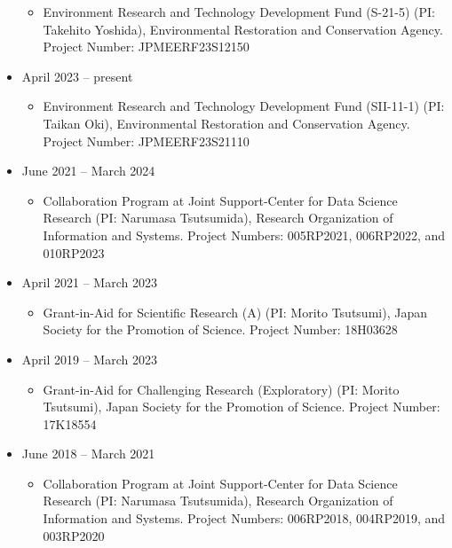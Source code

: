 \documentclass[
]{book}
\providecommand{\tightlist}{%
  \setlength{\itemsep}{0pt}\setlength{\parskip}{0pt}}
\begin{document}
\begin{itemize}
  \begin{itemize}
  \tightlist
  \item
    Environment Research and Technology Development Fund (S-21-5) (PI: Takehito Yoshida),
    Environmental Restoration and Conservation Agency.
    Project Number: JPMEERF23S12150
  \end{itemize}
\item
  April 2023 -- present

  \begin{itemize}
  \tightlist
  \item
    Environment Research and Technology Development Fund (SII-11-1) (PI: Taikan Oki),
    Environmental Restoration and Conservation Agency.
    Project Number: JPMEERF23S21110
  \end{itemize}
\item
  June 2021 -- March 2024

  \begin{itemize}
  \tightlist
  \item
    Collaboration Program at Joint Support-Center for Data Science Research (PI: Narumasa Tsutsumida),
    Research Organization of Information and Systems.
    Project Numbers: 005RP2021, 006RP2022, and 010RP2023
  \end{itemize}
\item
  April 2021 -- March 2023

  \begin{itemize}
  \tightlist
  \item
    Grant-in-Aid for Scientific Research (A) (PI: Morito Tsutsumi),
    Japan Society for the Promotion of Science.
    Project Number: 18H03628
  \end{itemize}
\item
  April 2019 -- March 2023

  \begin{itemize}
  \tightlist
  \item
    Grant-in-Aid for Challenging Research (Exploratory) (PI: Morito Tsutsumi),
    Japan Society for the Promotion of Science.
    Project Number: 17K18554
  \end{itemize}
\item
  June 2018 -- March 2021

  \begin{itemize}
  \tightlist
  \item
    Collaboration Program at Joint Support-Center for Data Science Research (PI: Narumasa Tsutsumida),
    Research Organization of Information and Systems.
    Project Numbers: 006RP2018, 004RP2019, and 003RP2020
  \end{itemize}
\end{itemize}
\end{document}
